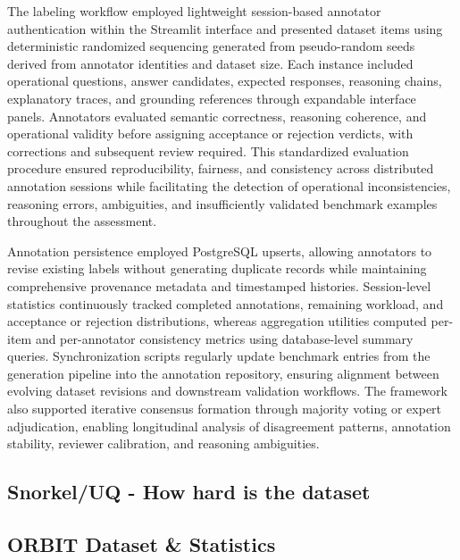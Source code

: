 \documentclass[conference]{IEEEtran}
\begin{document}
The labeling workflow employed lightweight session-based annotator authentication within the Streamlit interface and presented dataset items using deterministic randomized sequencing generated from pseudo-random seeds derived from annotator identities and dataset size. Each instance included operational questions, answer candidates, expected responses, reasoning chains, explanatory traces, and grounding references through expandable interface panels. Annotators evaluated semantic correctness, reasoning coherence, and operational validity before assigning acceptance or rejection verdicts, with corrections and subsequent review required. This standardized evaluation procedure ensured reproducibility, fairness, and consistency across distributed annotation sessions while facilitating the detection of operational inconsistencies, reasoning errors, ambiguities, and insufficiently validated benchmark examples throughout the assessment.

Annotation persistence employed PostgreSQL upserts, allowing annotators to revise existing labels without generating duplicate records while maintaining comprehensive provenance metadata and timestamped histories. Session-level statistics continuously tracked completed annotations, remaining workload, and acceptance or rejection distributions, whereas aggregation utilities computed per-item and per-annotator consistency metrics using database-level summary queries. Synchronization scripts regularly update benchmark entries from the generation pipeline into the annotation repository, ensuring alignment between evolving dataset revisions and downstream validation workflows. The framework also supported iterative consensus formation through majority voting or expert adjudication, enabling longitudinal analysis of disagreement patterns, annotation stability, reviewer calibration, and reasoning ambiguities.

\subsection{Snorkel/UQ - How hard is the dataset}

\subsection{ORBIT Dataset \& Statistics}
\label{sec:dataset_stats}
\end{document}

